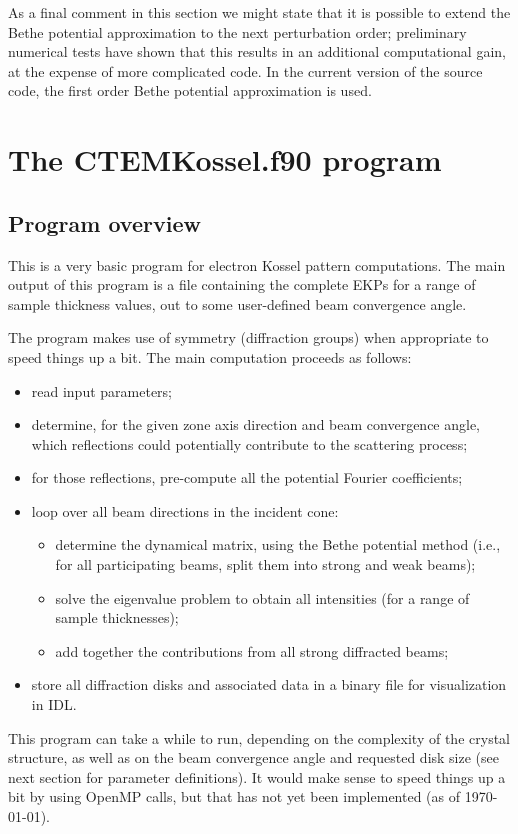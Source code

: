 \documentclass[DIV=calc, paper=letter, fontsize=11pt]{scrartcl}	 %
\begin{document}
As a final comment in this section we might state that it is possible to extend the Bethe potential approximation to the next perturbation
order; preliminary numerical tests have shown that this results in an additional computational gain, at the expense of more complicated
code.  In the current version of the source code, the first order Bethe potential approximation is used.

\newpage
\section{The \protect\textsf{CTEMKossel.f90} program\label{sec:f90Kossel}}

\subsection{Program overview\label{sec:f90overviewKossel}}
This is a very basic program for electron Kossel pattern computations.  The main output of 
this program is a file containing the complete EKPs for a range of sample thickness values, 
out to some user-defined beam convergence angle.  

The program makes use of symmetry (diffraction groups) when appropriate to speed 
things up a bit.  The main computation proceeds as follows:
\begin{itemize}
	\item read input parameters;
	\item determine, for the given zone axis direction and beam convergence angle, 
	which reflections could potentially contribute to the scattering process;
	\item for those reflections, pre-compute all the potential Fourier coefficients;
	\item loop over all beam directions in the incident cone:
	\begin{itemize}
		\item determine the dynamical matrix, using the Bethe potential method (i.e.,
		for all participating beams, split them into strong and weak beams);
		\item solve the eigenvalue problem to obtain all intensities (for a range of 
		sample thicknesses);
		\item add together the contributions from all strong diffracted beams;
	\end{itemize}
	\item store all diffraction disks and associated data in a binary file for visualization in IDL.
\end{itemize}
This program can take a while to run, depending on the complexity of the crystal structure,
as well as on the beam convergence angle and requested disk size (see next section for parameter 
definitions).  It would make sense to speed things up a bit by using OpenMP calls, but that has not yet
been implemented (as of \today).
\end{document}
